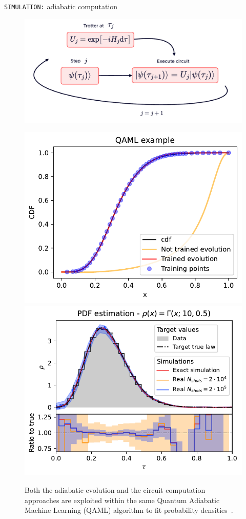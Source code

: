\documentclass[20pt, final]{beamer}
\newlength{\colwidth}
\begin{document}
\begin{frame}[t]
\begin{columns}[t]
\begin{column}{\colwidth}
\begin{block}{\texttt{SIMULATION:} adiabatic computation}
  


  \begin{figure}
    \includegraphics[width=0.78 \textwidth]{figures/trotter.pdf}
  \end{figure}
  
  \begin{figure}
    \includegraphics[width=0.5  \textwidth]{figures/evolution.pdf}%
    \includegraphics[width=0.5  \textwidth]{figures/PDF.pdf}
    \caption{Both the adiabatic evolution and the circuit computation approaches
    are exploited within the same Quantum Adiabatic Machine Learning (QAML) 
    algorithm to fit probability densities~\cite{robbiati2023determining}.}
  \end{figure}
  

\end{block}
\end{column}
\end{columns}
\end{frame}
\end{document}
